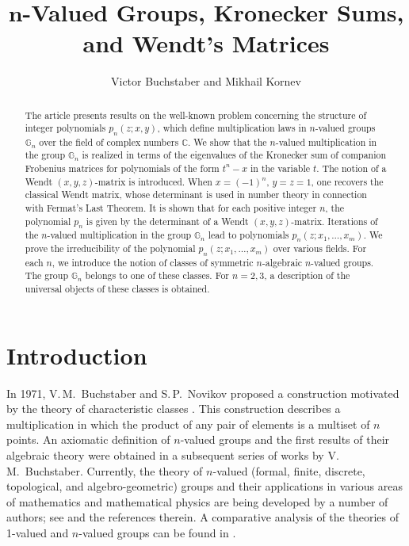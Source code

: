 \documentclass[14pt, dvipsnames]{extarticle}
\title{\bf $\bm{n}$-Valued Groups, Kronecker Sums, \\ and Wendt's Matrices}
\date{}
\author{Victor Buchstaber and Mikhail Kornev}
\theoremstyle{definition}
\theoremstyle{definition}
\theoremstyle{remark}
\begin{document}
\maketitle

\begin{abstract}
The article presents results on the well-known problem concerning the structure of integer polynomials $p_n(z; x, y)$, which define multiplication laws in $n$-valued groups $\mathbb{G}_n$ over the field of complex numbers $\mathbb{C}$. We show that the $n$-valued multiplication in the group $\mathbb{G}_n$ is realized in terms of the eigenvalues of the Kronecker sum of companion Frobenius matrices for polynomials of the form $t^n - x$ in the variable $t$. The notion of a Wendt $(x, y, z)$-matrix is introduced. When $x = (-1)^n$, $y = z = 1$, one recovers the classical Wendt matrix, whose determinant is used in number theory in connection with Fermat’s Last Theorem. It is shown that for each positive integer $n$, the polynomial $p_n$ is given by the determinant of a Wendt $(x, y, z)$-matrix. Iterations of the $n$-valued multiplication in the group $\mathbb{G}_n$ lead to polynomials $p_n(z; x_1, \dots, x_m)$. We prove the irreducibility of the polynomial $p_n(z; x_1, \dots, x_m)$ over various fields. For each $n$, we introduce the notion of classes of symmetric $n$-algebraic $n$-valued groups. The group $\mathbb{G}_n$ belongs to one of these classes. For $n = 2, 3$, a description of the universal objects of these classes is obtained.
\end{abstract}

\tableofcontents

\section{Introduction}\label{sec:intro}\label{intro}

In 1971, V.\,M.~Buchstaber and S.\,P.~Novikov proposed a construction motivated by the theory of characteristic classes \cite{Buchstaber_Novikov}. This construction describes a multiplication in which the product of any pair of elements is a multiset of $n$ points. An axiomatic definition of $n$-valued groups and the first results of their algebraic theory were obtained in a subsequent series of works by V.\,M.~Buchstaber. Currently, the theory of $n$-valued (formal, finite, discrete, topological, and algebro-geometric) groups and their applications in various areas of mathematics and mathematical physics are being developed by a number of authors; see \cite{Buchstaber75, Kholodov81, Buchstaber90, Buchstaber_Veselov, Vershik, BuchRees, Buchstaber, BuchVesGaif, BuchVesnin, Kontsevich_type_polynomials} and the references therein. A comparative analysis of the theories of 1-valued and $n$-valued groups can be found in \cite{Borovik}.
\end{document}
